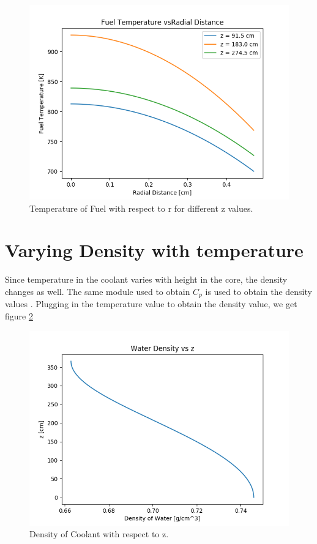 \documentclass[12pt,letterpaper]{article}
\begin{document}
\begin{figure}[htbp!]
    \begin{center}
        \includegraphics[scale=0.7]{t_f_r.png}
    \end{center}
    \caption{Temperature of Fuel with respect to r for different z values.}
    \label{fig:t_f_r}
\end{figure}

\section*{Varying Density with temperature}
Since temperature in the coolant varies with height in the core,
the density changes as well. The same module used to obtain $C_p$
is used to obtain the density values \cite{romera_iapws:_2017}.
Plugging in the temperature value to obtain the density value, we get
figure \ref{fig:rho_c_z}

\begin{figure}[htbp!]
    \begin{center}
        \includegraphics[scale=0.7]{rho_c_z.png}
    \end{center}
    \caption{Density of Coolant with respect to z.}
    \label{fig:rho_c_z}
\end{figure}
\end{document}
